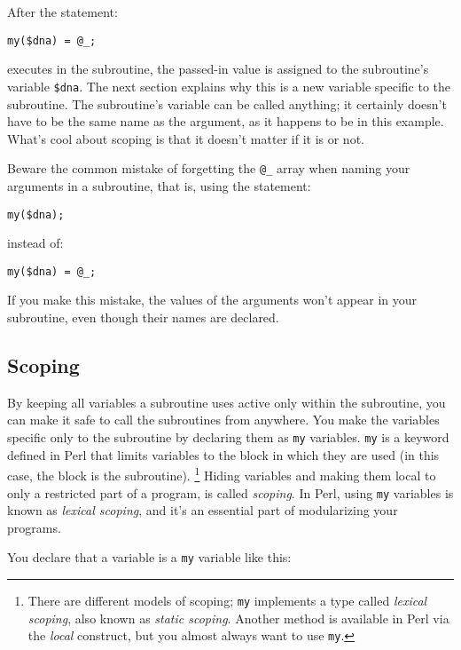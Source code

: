 After the statement:

\begin{lstlisting}
my($dna) = @_;
\end{lstlisting}

executes in the subroutine, the passed-in value is assigned to the subroutine's variable \verb|$dna|. The next section explains why this is a new variable specific to the subroutine. The subroutine's variable can be called anything; it certainly doesn't have to be the same name as the argument, as it happens to be in this example. What's cool about scoping is that it doesn't matter if it is or not. 

\begin{adjustwidth}{2cm}{2cm}
  Beware the common mistake of forgetting the \verb|@_| array when naming your arguments in a subroutine, that is, using the statement:
  \begin{lstlisting}
my($dna);
  \end{lstlisting}
  instead of:
  \begin{lstlisting}
my($dna) = @_;
  \end{lstlisting}
  If you make this mistake, the values of the arguments won't appear in your subroutine, even though their names are declared. 
\end{adjustwidth}

\subsection{Scoping}
By keeping all variables a subroutine uses active only within the subroutine, you can make it safe to call the subroutines from anywhere.  You make the variables specific only to the subroutine by declaring them as \verb|my| variables. \verb|my| is a keyword defined in Perl that limits variables to the block in which they are used (in this case, the block is the subroutine). \footnote{There are different models of scoping; \verb|my| implements a type called \textit{lexical scoping}, also known as \textit{static scoping}. Another method is available in Perl via the \textit{local} construct, but you almost always want to use \verb|my|.} 
Hiding variables and making them local to only a restricted part of a program, is called \textit{scoping}. In Perl, using \verb|my| variables is known as \textit{lexical scoping}, and it's an essential part of modularizing your programs.

You declare that a variable is a \verb|my| variable like this:

